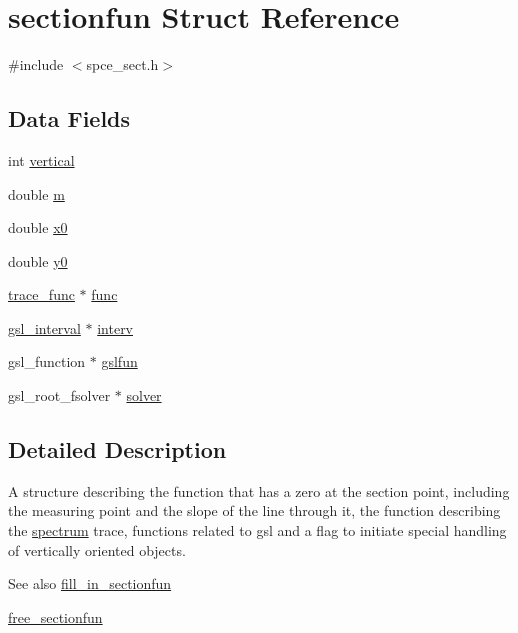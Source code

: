 \hypertarget{structsectionfun}{
\section{sectionfun Struct Reference}
\label{structsectionfun}
}


{\ttfamily \#include $<$spce\_\-sect.h$>$}\subsection*{Data Fields}
\begin{DoxyCompactItemize}
\item 
int \hyperlink{structsectionfun_aab0c499ac5e7d8871f5d88560f01e5ba}{vertical}
\item 
double \hyperlink{structsectionfun_a657c484c3b691ba3d76d582a972a8178}{m}
\item 
double \hyperlink{structsectionfun_a57e89a384211c3074227a9b459be3c4f}{x0}
\item 
double \hyperlink{structsectionfun_a6c35eb6e4aca39e7448423712e1179f2}{y0}
\item 
\hyperlink{structtrace__func}{trace\_\-func} $\ast$ \hyperlink{structsectionfun_ad5d55385480a9ee21cfdce5e6eb7fb94}{func}
\item 
\hyperlink{structgsl__interval}{gsl\_\-interval} $\ast$ \hyperlink{structsectionfun_ae67f890cbfcb7e8bd9ed1228982ae5e5}{interv}
\item 
gsl\_\-function $\ast$ \hyperlink{structsectionfun_a3eea06731198b02e52f5c8914648d28c}{gslfun}
\item 
gsl\_\-root\_\-fsolver $\ast$ \hyperlink{structsectionfun_a334da4ba5527ca09176f76cc35f63891}{solver}
\end{DoxyCompactItemize}


\subsection{Detailed Description}
A structure describing the function that has a zero at the section point, including the measuring point and the slope of the line through it, the function describing the \hyperlink{structspectrum}{spectrum} trace, functions related to gsl and a flag to initiate special handling of vertically oriented objects.

\begin{DoxySeeAlso}{See also}
\hyperlink{spce__sect_8h_ae2cd18c10f324ea7c2f50a1fa7864709}{fill\_\-in\_\-sectionfun} 

\hyperlink{spce__sect_8h_a048f454707d142b74123b2122c3e68cd}{free\_\-sectionfun} 
\end{DoxySeeAlso}


